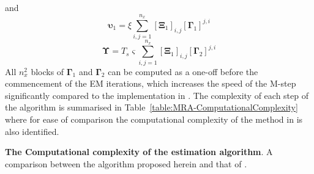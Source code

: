 \documentclass[review,authoryear,3p]{elsarticle}
\begin{document}
and
\begin{equation}\label{eq:epsilon1}
\boldsymbol\upsilon_1=\xi\sum_{i,j=1}^{n_x}[\boldsymbol\Xi_1]_{i,j}[\boldsymbol\Gamma_1]^{j,i}
\end{equation}
\begin{equation}\label{eq:Epsilon}
\boldsymbol\Upsilon=T_s\varsigma\sum_{i,j=1}^{n_x}[\boldsymbol\Xi_1]_{i,j}[\boldsymbol\Gamma_2]^{j,i}
\end{equation}
All $n_x^2$ blocks of $\boldsymbol\Gamma_1$ and $\boldsymbol\Gamma_2$  can be computed as a one-off before the commencement of the EM iterations, which increases the speed of the M-step significantly compared to the implementation in \citet{Dewar2009}. The complexity of each step of the algorithm is summarised in Table~\ref{table:MRA-ComputationalComplexity} where for ease of comparison the computational complexity of the method in \citet{Dewar2009} is also identified.
\begin {table}
\begin{center}
 \caption {{\bf The Computational complexity of the estimation algorithm}. A comparison between the algorithm proposed herein and that of \citet{Dewar2009}.} 
\label{table:MRA-ComputationalComplexity}
\end{center}
\end {table}
\end{document}
